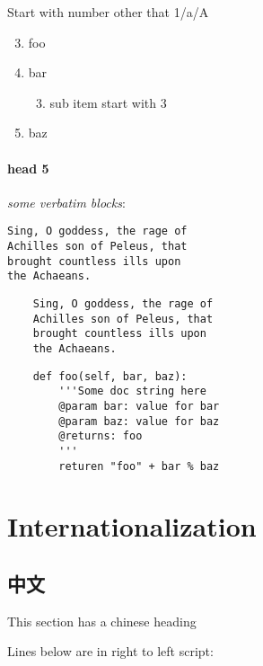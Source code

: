 Start with number other that 1/a/A



\begin{enumerate}[A]
\setcounter{enumi}{2}
\item foo
\item bar
	\begin{enumerate}[1]
	\setcounter{enumi}{2}
	\item sub item start with 3
	\end{enumerate}
\item baz
\end{enumerate}


\paragraph{head 5}
\emph{some verbatim blocks}:




\begin{lstlisting}
Sing, O goddess, the rage of
Achilles son of Peleus, that
brought countless ills upon
the Achaeans.

\end{lstlisting}



\begin{lstlisting}
    Sing, O goddess, the rage of
    Achilles son of Peleus, that
    brought countless ills upon
    the Achaeans.

\end{lstlisting}



\begin{lstlisting}
    def foo(self, bar, baz):
    	'''Some doc string here
    	@param bar: value for bar
    	@param baz: value for baz
    	@returns: foo
    	'''
    	returen "foo" + bar % baz

\end{lstlisting}


\section{Internationalization}


\subsection{中文}
This section has a chinese heading



Lines below are in right to left script:



